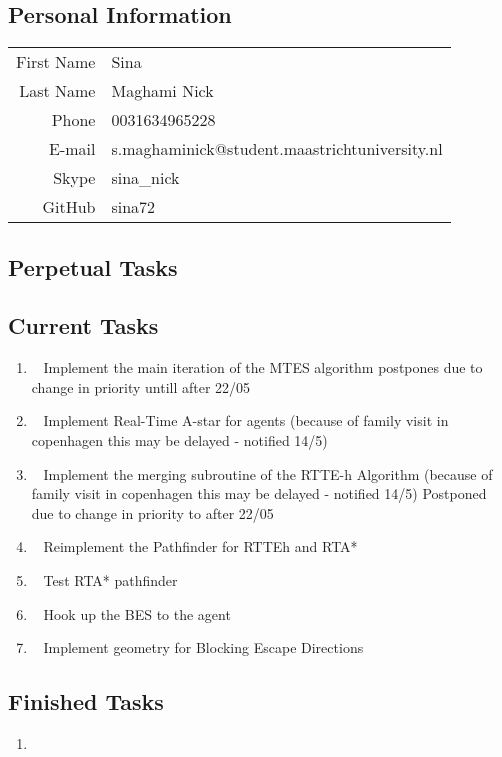 \subsection{Personal Information}
\begin{table}[h!]
	\begin{tabular}{rl}
	First Name 	& Sina\\
	Last Name	& Maghami Nick\\
	Phone		& 0031634965228\\
	E-mail		& s.maghaminick@student.maastrichtuniversity.nl\\
	Skype		& sina\_nick\\
	GitHub		& sina72
\end{tabular}
\end{table}

\subsection{Perpetual Tasks}

\subsection{Current Tasks}
\begin{enumerate}
	\item~
	Implement the main iteration of the MTES algorithm
		\subitem postpones due to change in priority untill after 22/05
	\item~
	Implement Real-Time A-star for agents
		\subitem (because of family visit in copenhagen this may be delayed - notified 14/5)
	\item~
	Implement the merging subroutine of the RTTE-h Algorithm
		\subitem (because of family visit in copenhagen this may be delayed - notified 14/5)
		\subitem Postponed due to change in priority to after 22/05
	\item~
		Reimplement the Pathfinder for RTTEh and RTA*
	\item~
		Test RTA* pathfinder
	\item~
		Hook up the BES to the agent
	\item~
		Implement geometry for Blocking Escape Directions
\end{enumerate}
\subsection{Finished Tasks}
\begin{enumerate}
	\item 
\end{enumerate}
